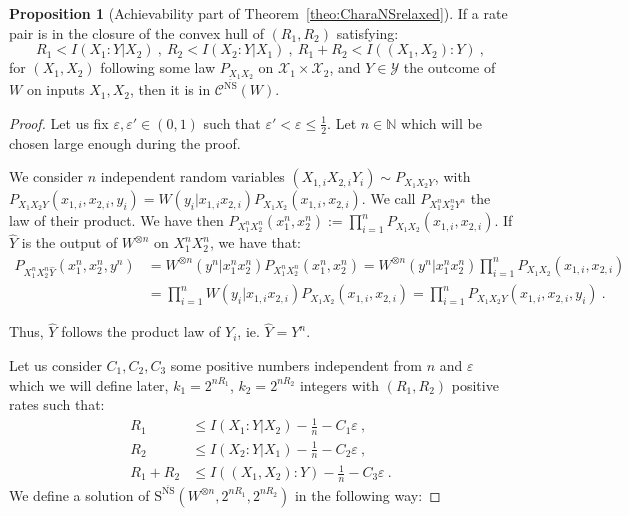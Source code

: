 \documentclass[11pt]{article}
\theoremstyle{definition}
\newtheorem{prop}[theo]{Proposition}
\theoremstyle{remark}
\begin{document}
  \begin{prop}[Achievability part of Theorem~\ref{theo:CharaNSrelaxed}]      
      \label{prop:AchievabilityNSrelaxed}
      If a rate pair is in the closure of the convex hull of $(R_1,R_2)$ satisfying:
      \[ R_1 < I(X_1:Y|X_2)\ ,\ R_2 < I(X_2:Y|X_1)\ ,\ R_1+R_2 < I((X_1,X_2):Y) \ ,\]
      for $(X_1,X_2)$ following some law $P_{X_1X_2}$ on $\mathcal{X}_1 \times \mathcal{X}_2$, and $Y \in \mathcal{Y}$ the outcome of $W$ on inputs $X_1,X_2$, then it is in $\mathcal{C}^{\overline{\mathrm{NS}}}(W)$.
  \end{prop}
  \begin{proof}
    Let us fix $\varepsilon,\varepsilon' \in (0,1)$ such that $\varepsilon' < \varepsilon \leq \frac{1}{2}$. Let $n \in \mathbb{N}$ which will be chosen large enough during the proof.

    We consider $n$ independent random variables $(X_{1,i}X_{2,i}Y_i) \sim P_{X_1X_2Y}$, with $P_{X_1X_2Y}(x_{1,i},x_{2,i},y_i) = W(y_i|x_{1,i}x_{2,i})P_{X_1X_2}(x_{1,i},x_{2,i})$. We call $P_{X_1^nX_2^nY^n} $ the law of their product. We have then $P_{X_1^nX_2^n}(x_1^n,x_2^n) := \prod_{i=1}^n P_{X_1X_2}(x_{1,i},x_{2,i})$. If $\hat{Y}$ is the output of $W^{\otimes n}$ on $X_1^nX_2^n$, we have that:
      \begin{equation}
        \begin{aligned}
          P_{X_1^nX_2^n\hat{Y}}(x_1^n,x_2^n,y^n) &= W^{\otimes n}(y^n|x_1^nx_2^n)P_{X_1^nX_2^n}(x_1^n,x_2^n) = W^{\otimes n}(y^n|x_1^nx_2^n)\prod_{i=1}^n P_{X_1X_2}(x_{1,i},x_{2,i})\\
          &= \prod_{i=1}^n W(y_i|x_{1,i}x_{2,i})P_{X_1X_2}(x_{1,i},x_{2,i}) = \prod_{i=1}^n P_{X_1X_2Y}(x_{1,i},x_{2,i},y_i) \ .
        \end{aligned}
      \end{equation}

      Thus, $\hat{Y}$ follows the product law of $Y_i$, ie.  $\hat{Y} = Y^n$.
      
  Let us consider $C_1,C_2,C_3$ some positive numbers independent from $n$ and $\varepsilon$ which we will define later,  $k_1 = 2^{nR_1}$, $k_2 = 2^{nR_2}$ integers with $(R_1,R_2)$ positive rates such that:
  \begin{equation}
      \begin{aligned}
        R_1 &\leq I(X_1:Y|X_2) - \frac{1}{n} - C_1\varepsilon \ ,\\
        R_2 &\leq I(X_2:Y|X_1) - \frac{1}{n} - C_2\varepsilon \ ,\\
        R_1+R_2 &\leq I((X_1,X_2):Y) - \frac{1}{n} - C_3\varepsilon \ .
      \end{aligned}
    \end{equation}
  We define a solution of $\mathrm{S}^{\overline{\mathrm{NS}}}(W^{\otimes n},2^{nR_1},2^{nR_2})$ in the following way:
      

\end{proof}
\end{document}
